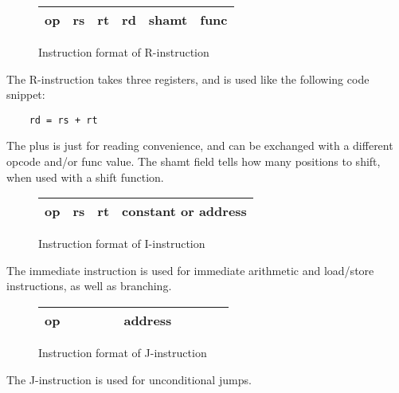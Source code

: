 \begin{figure}[ht]
    \centering
    \begin{tabular}{ | c | c | c | c | c | c | }
        \hline
        op & rs & rt & rd & shamt & func \\
        \hline
    \end{tabular}
    \caption{\label{fig:rInstruction}Instruction format of R-instruction}
\end{figure}

The R-instruction takes three registers, and is used like the following code
snippet:

\begin{verbatim}
    rd = rs + rt
\end{verbatim}

The plus is just for reading convenience, and can be exchanged with a different
opcode and/or func value. The shamt field tells how many positions to shift,
when used with a shift function.

\begin{figure}[ht]
    \centering
    \begin{tabular}{ | c | c | c |  c  | }
        \hline
        op & rs & rt & constant or address   \\
        \hline
    \end{tabular}
    \caption{\label{fig:iInstruction}Instruction format of I-instruction}
\end{figure}

The immediate instruction is used for immediate arithmetic and load/store
instructions, as well as branching. 


\begin{figure}[ht]
    \centering
    \begin{tabular}{ | c | c c c c c c c c c | }
        \hline
        op & & & & & address & & & &  \\
        \hline
    \end{tabular}
    \caption{\label{fig:jInstruction}Instruction format of J-instruction}
\end{figure}

The J-instruction is used for unconditional jumps.

